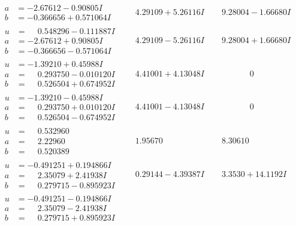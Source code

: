\documentclass[1p]{elsarticle_modified}
\theoremstyle{definition}
\begin{document}
$$\begin{array}{c|c|c}
\begin{aligned}
a &= -2.67612 - 0.90805 I \\
b &= -0.366656 + 0.571064 I\end{aligned}
 & \phantom{-}4.29109 + 5.26116 I & \phantom{-}9.28004 - 1.66680 I \\ \hline\begin{aligned}
u &= \phantom{-}0.548296 - 0.111887 I \\
a &= -2.67612 + 0.90805 I \\
b &= -0.366656 - 0.571064 I\end{aligned}
 & \phantom{-}4.29109 - 5.26116 I & \phantom{-}9.28004 + 1.66680 I \\ \hline\begin{aligned}
u &= -1.39210 + 0.45988 I \\
a &= \phantom{-}0.293750 - 0.010120 I \\
b &= \phantom{-}0.526504 + 0.674952 I\end{aligned}
 & \phantom{-}4.41001 + 4.13048 I & \phantom{-0.000000 } 0 \\ \hline\begin{aligned}
u &= -1.39210 - 0.45988 I \\
a &= \phantom{-}0.293750 + 0.010120 I \\
b &= \phantom{-}0.526504 - 0.674952 I\end{aligned}
 & \phantom{-}4.41001 - 4.13048 I & \phantom{-0.000000 } 0 \\ \hline\begin{aligned}
u &= \phantom{-}0.532960\phantom{ +0.000000I} \\
a &= \phantom{-}2.22960\phantom{ +0.000000I} \\
b &= \phantom{-}0.520389\phantom{ +0.000000I}\end{aligned}
 & \phantom{-}1.95670\phantom{ +0.000000I} & \phantom{-}8.30610\phantom{ +0.000000I} \\ \hline\begin{aligned}
u &= -0.491251 + 0.194866 I \\
a &= \phantom{-}2.35079 + 2.41938 I \\
b &= \phantom{-}0.279715 - 0.895923 I\end{aligned}
 & \phantom{-}0.29144 - 4.39387 I & \phantom{-}3.3530 + 14.1192 I \\ \hline\begin{aligned}
u &= -0.491251 - 0.194866 I \\
a &= \phantom{-}2.35079 - 2.41938 I \\
b &= \phantom{-}0.279715 + 0.895923 I\end{aligned}

\end{array}$$
\end{document}
